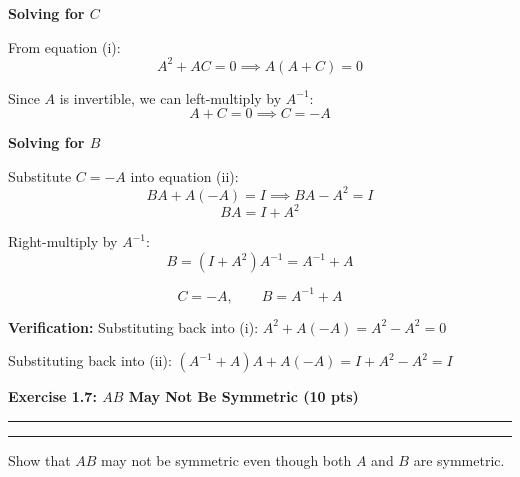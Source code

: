 \documentclass[12pt]{article}
\newcommand{\question}[1]{%
  \clearpage
  \vspace{0.5cm}
  {\noindent\normalsize \textbf{#1}}
  \vspace{0.2cm}
  \hrule
  \vspace{0.1cm}
  \hrule
  \vspace{0.3cm}
}
\begin{document}
\begin{stepbox}
\textbf{Solving for $C$}

From equation (i):
\[
A^2 + AC = 0 \implies A(A + C) = 0
\]

Since $A$ is invertible, we can left-multiply by $A^{-1}$:
\[
A + C = 0 \implies \boxed{C = -A}
\]
\end{stepbox}

\begin{stepbox}
\textbf{Solving for $B$}

Substitute $C = -A$ into equation (ii):
\[
BA + A(-A) = I \implies BA - A^2 = I
\]
\[
BA = I + A^2
\]

Right-multiply by $A^{-1}$:
\[
B = (I + A^2)A^{-1} = A^{-1} + A
\]
\end{stepbox}

\begin{resultsbox}
\[
\boxed{C = -A}, \qquad \boxed{B = A^{-1} + A}
\]

\textbf{Verification:} Substituting back into (i): $A^2 + A(-A) = A^2 - A^2 = 0$ \checkmark

Substituting back into (ii): $(A^{-1} + A)A + A(-A) = I + A^2 - A^2 = I$ \checkmark
\end{resultsbox}


\question{Exercise 1.7: $AB$ May Not Be Symmetric (10 pts)}\label{quest:1.7}

Show that $AB$ may not be symmetric even though both $A$ and $B$ are symmetric.
\end{document}
